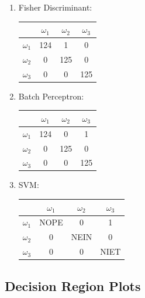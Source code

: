 \documentclass[a4paper]{article}
\begin{document}
\begin{multicols}{2}
\begin{enumerate}
\item Fisher Discriminant:

\begin{tabular}{ | l | c | c | c | }
\hline
& $\omega_1$ & $\omega_2$ & $\omega_3$ \\
\hline
  $\omega_1$ & 124 & 1 & 0 \\
\hline
  $\omega_2$ & 0 & 125 & 0 \\
\hline
  $\omega_3$ & 0 & 0 & 125 \\
\hline
\end{tabular}

\item Batch Perceptron:

\begin{tabular}{ | l | c | c | c | }
\hline
& $\omega_1$ & $\omega_2$ & $\omega_3$ \\
\hline
  $\omega_1$ & 124 & 0 & 1 \\
\hline
  $\omega_2$ & 0 & 125 & 0 \\
\hline
  $\omega_3$ & 0 & 0 & 125 \\
\hline
\end{tabular}
\columnbreak

\item SVM:

\begin{tabular}{ | l | c | c | c | }
\hline
& $\omega_1$ & $\omega_2$ & $\omega_3$ \\
\hline
  $\omega_1$ & NOPE & 0 & 1 \\
\hline
  $\omega_2$ & 0 & NEIN & 0 \\
\hline
  $\omega_3$ & 0 & 0 & NIET \\
\hline
\end{tabular}
\end{enumerate}
\end{multicols}


\newpage
\subsection{Decision Region Plots}
\end{document}
